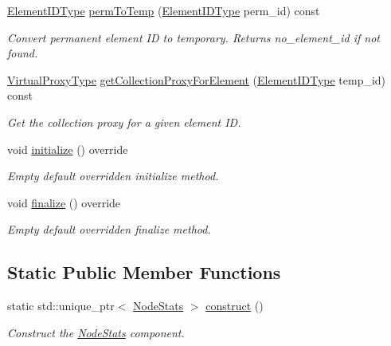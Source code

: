 \begin{DoxyCompactItemize}
\hyperlink{namespacevt_1_1vrt_1_1collection_1_1balance_a14c8d2c972f2913aa3f1636e5be0a120}{Element\+I\+D\+Type} \hyperlink{structvt_1_1vrt_1_1collection_1_1balance_1_1_node_stats_a6e13d373b5365771b1f08fc0bd5c0bda}{perm\+To\+Temp} (\hyperlink{namespacevt_1_1vrt_1_1collection_1_1balance_a14c8d2c972f2913aa3f1636e5be0a120}{Element\+I\+D\+Type} perm\+\_\+id) const
\begin{DoxyCompactList}\small\item\em Convert permanent element ID to temporary. Returns {\ttfamily no\+\_\+element\+\_\+id} if not found. \end{DoxyCompactList}\item 
\hyperlink{namespacevt_a1b417dd5d684f045bb58a0ede70045ac}{Virtual\+Proxy\+Type} \hyperlink{structvt_1_1vrt_1_1collection_1_1balance_1_1_node_stats_aee43291b1cc63a189b3851f92e83040b}{get\+Collection\+Proxy\+For\+Element} (\hyperlink{namespacevt_1_1vrt_1_1collection_1_1balance_a14c8d2c972f2913aa3f1636e5be0a120}{Element\+I\+D\+Type} temp\+\_\+id) const
\begin{DoxyCompactList}\small\item\em Get the collection proxy for a given element ID. \end{DoxyCompactList}\item 
void \hyperlink{structvt_1_1vrt_1_1collection_1_1balance_1_1_node_stats_a0c60d1566daa6465f56b09e27058d6a1}{initialize} () override
\begin{DoxyCompactList}\small\item\em Empty default overridden initialize method. \end{DoxyCompactList}\item 
void \hyperlink{structvt_1_1vrt_1_1collection_1_1balance_1_1_node_stats_a267ac0f73734b89797be774b0bd6e7d1}{finalize} () override
\begin{DoxyCompactList}\small\item\em Empty default overridden finalize method. \end{DoxyCompactList}\end{DoxyCompactItemize}
\subsection*{Static Public Member Functions}
\begin{DoxyCompactItemize}
\item 
static std\+::unique\+\_\+ptr$<$ \hyperlink{structvt_1_1vrt_1_1collection_1_1balance_1_1_node_stats}{Node\+Stats} $>$ \hyperlink{structvt_1_1vrt_1_1collection_1_1balance_1_1_node_stats_a6c57b741ccef7c6d51155c3630dc380a}{construct} ()
\begin{DoxyCompactList}\small\item\em Construct the \hyperlink{structvt_1_1vrt_1_1collection_1_1balance_1_1_node_stats}{Node\+Stats} component. \end{DoxyCompactList}\end{DoxyCompactItemize}
